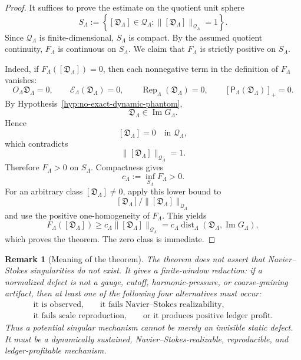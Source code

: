 \documentclass[11pt]{article}
\numberwithin{equation}{section}
\newtheorem{remark}[theorem]{Remark}
\begin{document}
\begin{proof}
It suffices to prove the estimate on the quotient unit sphere
\[
        S_\Lambda
        :=
        \left\{
        [\mathfrak D_\Lambda]\in\mathcal Q_\Lambda:
        \|[\mathfrak D_\Lambda]\|_{\mathcal Q_\Lambda}=1
        \right\}.
\]
Since \(\mathcal Q_\Lambda\) is finite-dimensional, \(S_\Lambda\) is
compact.  By the assumed quotient continuity, \(F_\Lambda\) is continuous
on \(S_\Lambda\).  We claim that \(F_\Lambda\) is strictly positive on
\(S_\Lambda\).

Indeed, if \(F_\Lambda([\mathfrak D_\Lambda])=0\), then each nonnegative
term in the definition of \(F_\Lambda\) vanishes:
\[
        O_\Lambda\mathfrak D_\Lambda=0,
        \qquad
        \mathcal E_\Lambda(\mathfrak D_\Lambda)=0,
        \qquad
        \operatorname{Rep}_\Lambda(\mathfrak D_\Lambda)=0,
        \qquad
        [\mathsf P_\Lambda(\mathfrak D_\Lambda)]_+=0.
\]
By Hypothesis~\ref{hyp:no-exact-dynamic-phantom},
\[
        \mathfrak D_\Lambda\in\operatorname{Im}G_\Lambda.
\]
Hence
\[
        [\mathfrak D_\Lambda]=0
        \quad\text{in }\mathcal Q_\Lambda,
\]
which contradicts
\[
        \|[\mathfrak D_\Lambda]\|_{\mathcal Q_\Lambda}=1.
\]
Therefore \(F_\Lambda>0\) on \(S_\Lambda\).  Compactness gives
\[
        c_\Lambda
        :=
        \inf_{S_\Lambda}F_\Lambda
        >0.
\]
For an arbitrary class \([\mathfrak D_\Lambda]\neq0\), apply this lower
bound to
\[
        [\mathfrak D_\Lambda]/
        \|[\mathfrak D_\Lambda]\|_{\mathcal Q_\Lambda}
\]
and use the positive one-homogeneity of \(F_\Lambda\).  This yields
\[
        F_\Lambda([\mathfrak D_\Lambda])
        \ge
        c_\Lambda
        \|[\mathfrak D_\Lambda]\|_{\mathcal Q_\Lambda}
        =
        c_\Lambda
        \operatorname{dist}_\Lambda
        (\mathfrak D_\Lambda,\operatorname{Im}G_\Lambda),
\]
which proves the theorem.  The zero class is immediate.
\end{proof}

\begin{remark}[Meaning of the theorem]
The theorem does not assert that Navier--Stokes singularities do not
exist.  It gives a finite-window reduction: if a normalized defect is not
a gauge, cutoff, harmonic-pressure, or coarse-graining artifact, then at
least one of the following four alternatives must occur:
\[
\begin{gathered}
        \text{it is observed,}\qquad
        \text{it fails Navier--Stokes realizability,}\\
        \text{it fails scale reproduction,}\qquad
        \text{or it produces positive ledger profit.}
\end{gathered}
\]
Thus a potential singular mechanism cannot be merely an invisible static
defect.  It must be a dynamically sustained, Navier--Stokes-realizable,
reproducible, and ledger-profitable mechanism.
\end{remark}
\end{document}
